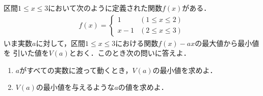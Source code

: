 \documentclass[a4j]{jarticle}
\begin{document}

     \begin{oframed}
     区間$1\le x\le 3$において次のように定義された関数$f(x)$がある．
          \begin{align*}
          f(x)=
               \begin{cases}
               1&(1\le x\le 2) \\
               x-1&(2\le x\le3)
               \end{cases}
          \end{align*}
     いま実数$a$に対して，区間$1\le x\le 3$における関数$f(x)-ax$の最大値から最小値を
     引いた値を$V(a)$とおく．このとき次の問いに答えよ．
         \begin{enumerate}[(1)]
         \item $a$がすべての実数に渡って動くとき，$V(a)$の最小値を求めよ．
         \item $V(a)$の最小値を与えるような$a$の値を求めよ．
         \end{enumerate}
     \end{oframed}
\end{document}
